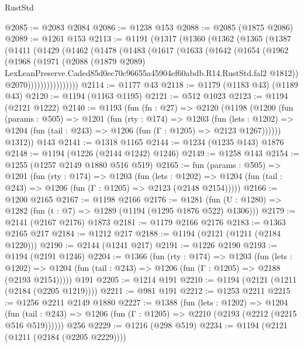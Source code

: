 \begin{lexlean}{RustStd}
\begin{coremodule}
@2085 := @2083 @2084
@2086 := @1238 @153
@2088 := @2085 (@1875 @2086)
@2089 := @1261 @153
@2113 := @1191
    (@1317
      (@1360
        (@1362
          (@1365
            (@1387
              (@1411
                (@1429
                  (@1462
                    (@1478
                      (@1483
                        (@1617
                          (@1633
                            (@1642
                              (@1654
                                (@1962
                                  (@1968
                                    (@1971
                                      (@2088
                                        (@1879 @2089)
                                        LexLeanPreserve.Caded85d0ec70c96655a45904ef60abdb.R14.RustStd.fal2
                                        @1812))
                                    @2070))))))))))))))))
@2114 := @1177 @43
@2118 := @1179 (@1183 @43) (@1189 @43)
@2120 := @1194 (@1163 @1195)
@2121 := @512 @1023
@2123 := @1194 (@2121 @1222)
@2140 := @1193
    (fun (fn : @27) =>
    @2120
      (@1198
        (@1200
          (fun (params : @505) =>
          @1201
            (fun (rty : @174) =>
            @1203
              (fun (lets : @1202) =>
              @1204 (fun (tail : @243) => @1206 (fun (Γ : @1205) => @2123 @1267))))))
        @1312))
    @143
@2141 := @1318 @1165
@2144 := @1234 (@1235 @143) @1876
@2148 := @1194 (@1226 (@2144 @1242) @1246)
@2149 := @1258 @143
@2154 := @1255 (@1257 @2149 @1880 @516 @519)
@2165 := fun (params : @505) =>
  @1201
    (fun (rty : @174) =>
    @1203
      (fun (lets : @1202) =>
      @1204 (fun (tail : @243) => @1206 (fun (Γ : @1205) => @2123 (@2148 @2154)))))
@2166 := @1200 @2165
@2167 := @1198 @2166
@2176 := @1281 (fun (U : @1280) => @1282 (fun (t : @7) => @1289 (@1194 (@1295 @1876 @522) @1306)))
@2179 := @2141 (@2167 @2176) @1873
@2181 := @1179 @2166 @2176
@2183 := @1363 @2165 @217
@2184 := @1212 @217
@2188 := @1194 (@2121 (@1211 (@2184 @1220)))
@2190 := @2144 (@1241 @217)
@2191 := @1226 @2190
@2193 := @1194 (@2191 @1246)
@2204 := @1366
    (fun (rty : @174) =>
    @1203
      (fun (lets : @1202) =>
      @1204 (fun (tail : @243) => @1206 (fun (Γ : @1205) => @2188 (@2193 @2154)))))
    @191
@2205 := @1214 @191
@2210 := @1194 (@2121 (@1211 (@2184 (@2205 @1219))))
@2211 := @981 @191
@2212 := @1253 @2211
@2215 := @1256 @2211 @2149 @1880
@2227 := @1388
    (fun (lets : @1202) =>
    @1204 (fun (tail : @243) => @1206 (fun (Γ : @1205) => @2210 (@2193 (@2212 (@2215 @516 @519))))))
    @256
@2229 := @1216 (@298 @519)
@2234 := @1194 (@2121 (@1211 (@2184 (@2205 @2229))))

\end{coremodule}
\end{lexlean}
